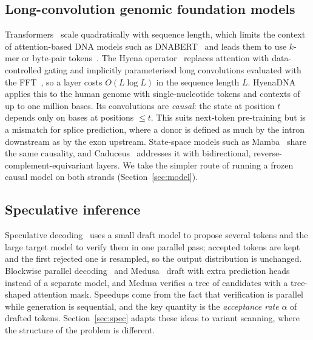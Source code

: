 \documentclass[conference]{IEEEtran}
\begin{document}
\subsection{Long-convolution genomic foundation models}
Transformers~\cite{vaswani2017attention} scale quadratically with sequence length, which limits the context of attention-based DNA models such as DNABERT~\cite{ji2021dnabert} and leads them to use $k$-mer or byte-pair tokens~\cite{zhou2024dnabert2,dallatorre2025nt}. The Hyena operator~\cite{poli2023hyena} replaces attention with data-controlled gating and implicitly parameterised long convolutions evaluated with the FFT~\cite{cooley1965fft}, so a layer costs $O(L\log L)$ in the sequence length $L$. HyenaDNA~\cite{nguyen2023hyenadna} applies this to the human genome with single-nucleotide tokens and contexts of up to one million bases. Its convolutions are \emph{causal}: the state at position $t$ depends only on bases at positions $\le t$. This suits next-token pre-training but is a mismatch for splice prediction, where a donor is defined as much by the intron downstream as by the exon upstream. State-space models such as Mamba~\cite{gu2023mamba} share the same causality, and Caduceus~\cite{schiff2024caduceus} addresses it with bidirectional, reverse-complement-equivariant layers. We take the simpler route of running a frozen causal model on both strands (Section~\ref{sec:model}).

\subsection{Speculative inference}
Speculative decoding~\cite{leviathan2023speculative,chen2023speculative} uses a small draft model to propose several tokens and the large target model to verify them in one parallel pass; accepted tokens are kept and the first rejected one is resampled, so the output distribution is unchanged. Blockwise parallel decoding~\cite{stern2018blockwise} and Medusa~\cite{cai2024medusa} draft with extra prediction heads instead of a separate model, and Medusa verifies a tree of candidates with a tree-shaped attention mask. Speedups come from the fact that verification is parallel while generation is sequential, and the key quantity is the \emph{acceptance rate} $\alpha$ of drafted tokens. Section~\ref{sec:spec} adapts these ideas to variant scanning, where the structure of the problem is different.

\end{document}
